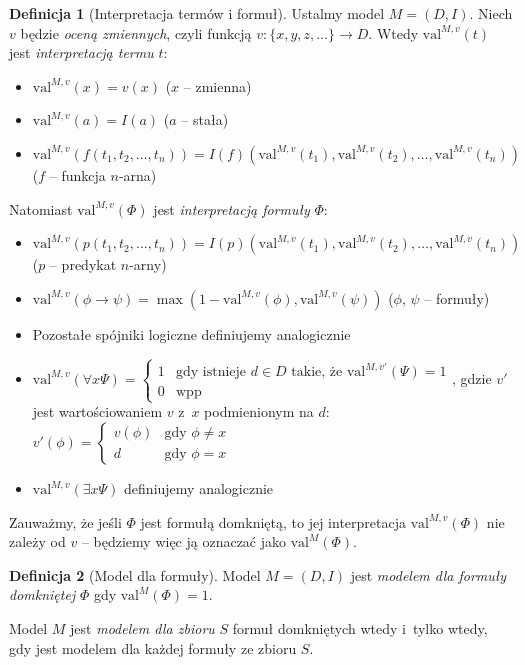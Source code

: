 \documentclass[10pt,a4paper]{article}
\theoremstyle{plain}
\theoremstyle{definition}
\newtheorem*{definition}{Definicja}
\newcommand{\impl}{\rightarrow}
\begin{document}
\begin{definition}[Interpretacja termów i formuł]
  Ustalmy model $M=(D,I)$.  Niech $v$ będzie \emph{oceną zmiennych},
  czyli funkcją $v : \lbrace x, y, z,\ldots \rbrace \rightarrow D$.
  Wtedy $\text{val}^{M,v}(t)$ jest \emph{interpretacją termu} $t$:
  \begin{itemize}
    \item $\text{val}^{M,v}(x) = v(x)$ ($x$ -- zmienna)
    \item $\text{val}^{M,v}(a) = I(a)$ ($a$ -- stała)
    \item $\text{val}^{M,v}(f(t_1,t_2,\ldots,t_n)) =
      I(f)(\text{val}^{M,v}(t_1), \mathrm{val}^{M,v}(t_2), \ldots,
      \text{val}^{M,v}(t_n))$ ($f$ -- funkcja $n$-arna)
  \end{itemize}
  Natomiast $\text{val}^{M,v}(\Phi)$ jest \emph{interpretacją formuły} $\Phi$:
  \begin{itemize}
    \item $\text{val}^{M,v}(p(t_1,t_2,\ldots,t_n)) =
      I(p)(\text{val}^{M,v}(t_1), \mathrm{val}^{M,v}(t_2), \ldots,
      \text{val}^{M,v}(t_n))$ ($p$ -- predykat $n$-arny)
    \item $\text{val}^{M,v}(\phi \impl \psi) =
      \max(1 - \text{val}^{M,v}(\phi), \mathrm{val}^{M,v}(\psi))$
      ($\phi$, $\psi$ -- formuły)
    \item Pozostałe spójniki logiczne definiujemy analogicznie
    \item $\text{val}^{M,v}(\forall x \Psi) = \begin{cases}
        1 & \text{gdy istnieje } d \in D \text{ takie, że }
        \text{val}^{M,v'}(\Psi) = 1 \\
        0 & \text{wpp}
      \end{cases}$, gdzie $v'$ jest wartościowaniem $v$ z~$x$ podmienionym
      na $d$: $v'(\phi) = \begin{cases} v(\phi) & \text{gdy } \phi \ne x \\
      d & \text{gdy } \phi = x \end{cases}$
    \item $\text{val}^{M,v}(\exists x \Psi)$ definiujemy analogicznie
  \end{itemize}

  Zauważmy, że jeśli $\Phi$ jest formułą domkniętą, to jej interpretacja
  $\text{val}^{M,v}(\Phi)$ nie zależy od $v$ -- będziemy więc ją oznaczać
  jako $\text{val}^{M}(\Phi)$.
\end{definition}

\begin{definition}[Model dla formuły]
  Model $M=(D,I)$ jest \emph{modelem dla formuły domkniętej} $\Phi$ gdy
  $\text{val}^M(\Phi) = 1$.
  
  Model $M$ jest \emph{modelem dla zbioru} $S$ formuł domkniętych wtedy i~tylko wtedy,
  gdy jest modelem dla każdej formuły ze zbioru $S$.
\end{definition}
\end{document}
